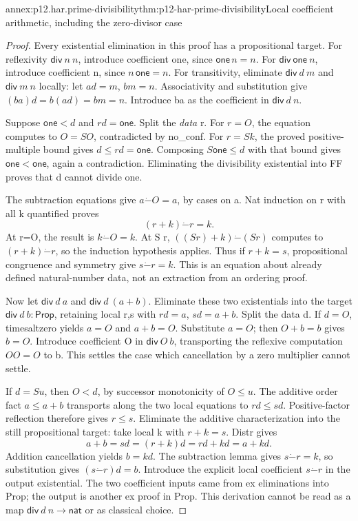 \begin{annexitem}{annex:p12.har.prime-divisibility}{thm:p12-har-prime-divisibility}{Local coefficient arithmetic, including the zero-divisor case}
\begin{proof}
Every existential elimination in this proof has a propositional target.
For reflexivity \(\mathsf{div}\ n\ n\), introduce coefficient one,
since \(\mathsf{one}\,n=n\). For \(\mathsf{div}\ \mathsf{one}\ n\),
introduce coefficient n, since \(n\,\mathsf{one}=n\).
For transitivity, eliminate \(\mathsf{div}\ d\ m\) and
\(\mathsf{div}\ m\ n\) locally: let \(ad=m\), \(bm=n\).
Associativity and substitution give \((ba)d=b(ad)=bm=n\).
Introduce ba as the coefficient in \(\mathsf{div}\ d\ n\).

Suppose \(\mathsf{one}<d\) and \(rd=\mathsf{one}\).
Split the \emph{data} r. For \(r=O\), the equation computes to
\(O=S O\), contradicted by no_conf. For \(r=S k\), the proved
positive-multiple bound gives \(d\le rd=\mathsf{one}\).
Composing \(S\mathsf{one}\le d\) with that bound gives
\(\mathsf{one}<\mathsf{one}\), again a contradiction. Eliminating
the divisibility existential into FF proves that d cannot divide one.

The subtraction equations give \(a\mathbin{\dot{-}}O=a\), by
cases on a. Nat induction on r with all k quantified proves
\[
 (r+k)\mathbin{\dot{-}}r=k.
\]
At r=O, the result is \(k\mathbin{\dot{-}}O=k\). At S r,
\(((S r)+k)\mathbin{\dot{-}}(S r)\) computes to
\((r+k)\mathbin{\dot{-}}r\), so the induction hypothesis applies.
Thus if \(r+k=s\), propositional congruence and symmetry give
\(s\mathbin{\dot{-}}r=k\). This is an equation about already
defined natural-number data, not an extraction from an ordering proof.

Now let \(\mathsf{div}\ d\ a\) and \(\mathsf{div}\ d\ (a+b)\).
Eliminate these two existentials into the target
\(\mathsf{div}\ d\ b:\mathsf{Prop}\), retaining local r,s with
\(rd=a\), \(sd=a+b\). Split the data d.
If \(d=O\), timesaltzero yields \(a=O\) and \(a+b=O\).
Substitute \(a=O\); then \(O+b=b\) gives \(b=O\).
Introduce coefficient O in \(\mathsf{div}\ O\ b\), transporting
the reflexive computation \(OO=O\) to b. This settles the case
which cancellation by a zero multiplier cannot settle.

If \(d=S u\), then \(O<d\), by successor monotonicity of
\(O\le u\). The additive order fact \(a\le a+b\) transports
along the two local equations to \(rd\le sd\). Positive-factor
reflection therefore gives \(r\le s\). Eliminate the additive
characterization into the still propositional target: take local k
with \(r+k=s\). Distr gives
\[
 a+b=sd=(r+k)d=rd+kd=a+kd.
\]
Addition cancellation yields \(b=kd\). The subtraction lemma gives
\(s\mathbin{\dot{-}}r=k\), so substitution gives
\((s\mathbin{\dot{-}}r)d=b\). Introduce the explicit local
coefficient \(s\mathbin{\dot{-}}r\) in the output existential.
The two coefficient inputs came from ex eliminations into Prop; the
output is another ex proof in Prop. This derivation cannot be read as
a map \(\mathsf{div}\ d\ n\to\mathsf{nat}\) or as classical choice.
\end{proof}
\end{annexitem}

